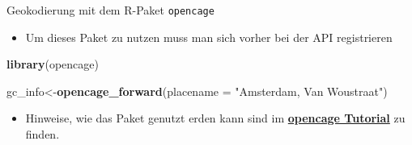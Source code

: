 \documentclass[ignorenonframetext,]{beamer}
\newenvironment{Shaded}{\begin{snugshade}}{\end{snugshade}}
\newcommand{\DataTypeTok}[1]{\textcolor[rgb]{0.13,0.29,0.53}{#1}}
\newcommand{\KeywordTok}[1]{\textcolor[rgb]{0.13,0.29,0.53}{\textbf{#1}}}
\newcommand{\NormalTok}[1]{#1}
\newcommand{\StringTok}[1]{\textcolor[rgb]{0.31,0.60,0.02}{#1}}
\providecommand{\tightlist}{%
  \setlength{\itemsep}{0pt}\setlength{\parskip}{0pt}}
\begin{document}
\begin{frame}[fragile]{Geokodierung mit dem R-Paket \texttt{opencage}}
\protect\hypertarget{geokodierung-mit-dem-r-paket-opencage}{}

\begin{itemize}
\tightlist
\item
  Um dieses Paket zu nutzen muss man sich vorher bei der API
  registrieren
\end{itemize}

\begin{Shaded}
\begin{Highlighting}[]
\KeywordTok{library}\NormalTok{(opencage)}
\end{Highlighting}
\end{Shaded}

\begin{Shaded}
\begin{Highlighting}[]
\NormalTok{gc_info<-}\KeywordTok{opencage_forward}\NormalTok{(}\DataTypeTok{placename =} 
                              \StringTok{"Amsterdam, Van Woustraat"}\NormalTok{)}
\end{Highlighting}
\end{Shaded}

\begin{itemize}
\tightlist
\item
  Hinweise, wie das Paket genutzt erden kann sind im
  \href{https://ropensci.org/tutorials/opencage_tutorial/}{\textbf{opencage
  Tutorial}} zu finden.
\end{itemize}

\end{frame}
\end{document}
